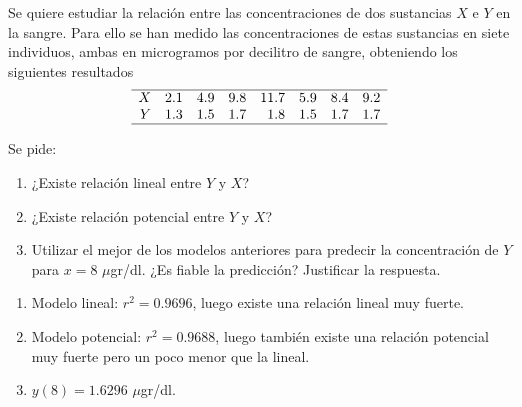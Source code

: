 {Se quiere estudiar la relación entre las concentraciones de dos sustancias $X$ e $Y$ en la sangre.
Para ello se han medido las concentraciones de estas sustancias en siete individuos, ambas en microgramos por
decilitro de sangre, obteniendo los siguientes resultados
\[
\begin{array}{rrrrrrrr}
   \hline
X & 2.1 & 4.9 & 9.8 & 11.7 & 5.9 & 8.4 & 9.2 \\ 
  Y & 1.3 & 1.5 & 1.7 & 1.8 & 1.5 & 1.7 & 1.7 \\ 
   \hline
\end{array}
\]

Se pide:
\begin{enumerate}
\item ¿Existe relación lineal entre $Y$ y $X$?
\item ¿Existe relación potencial entre $Y$ y $X$?
\item Utilizar el mejor de los modelos anteriores para predecir la concentración de $Y$ para $x=8$ $\mu$gr/dl. ¿Es fiable la predicción?
Justificar la respuesta.	
\end{enumerate}
}
{\begin{enumerate}
\item Modelo lineal: $r^2=0.9696$, luego existe una relación lineal muy fuerte.
\item Modelo potencial: $r^2=0.9688$, luego también existe una relación potencial muy fuerte pero un poco menor que la lineal.
\item $y(8)=1.6296$ $\mu$gr/dl.
\end{enumerate}
}
